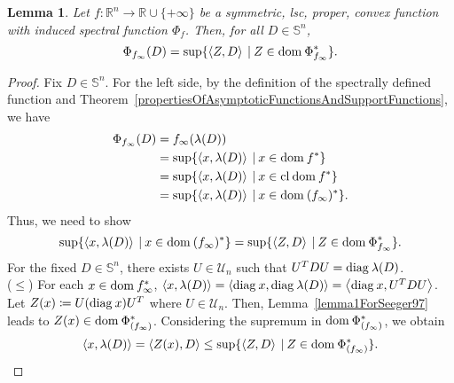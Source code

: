 \documentclass[a4paper,11pt, oneside]{book}
\newtheorem{lem}[thm]{Lemma}
\theoremstyle{definition}
\newcommand{\RealNumberSet}{\mathbb{R}}
\newcommand{\NDemenstionalRealEuclideanSpace}{\mathbb{R}^n}
\newcommand{\NDemenstionalRealSymmetricMatrixSpace}{\mathbb{S}^n}
\newcommand{\NDemenstionalRealOthonormalMatrixSpace}{\mathcal{U}_n}
\newcommand{\Closure}[1]{\text{\rm cl\:${#1}$}} %
\newcommand{\Domain}[1]{\text{\rm dom\:${#1}$}} %
\newcommand{\Diagnosis}[1]{\text{\rm diag\:${#1}$}} %
\newcommand{\InnerProduct}[2]{\left\langle {#1},{#2}\right\rangle} %
\newcommand{\ExtendedRealValuedFunction}[2]{{#1}: {#2} \to \RealNumberSet \cup \{+\infty\}}
\newcommand{\ConjugateFunction}[1]{{#1}^*}
\begin{document}
\begin{lem}\label{lemma2ForSeeger97}
  Let $\ExtendedRealValuedFunction{f}{\NDemenstionalRealEuclideanSpace}$ be a symmetric, lsc, proper, convex function with induced spectral function $\Phi_{f}$. Then, for all $D \in \NDemenstionalRealSymmetricMatrixSpace$,
  \begin{equation}
    \Phi_{f_{\infty}}(D) = \sup \{\InnerProduct{Z}{D} \:|\: Z \in \Domain{\Phi}_{f_{\infty}}^*\}. \notag
  \end{equation}
\end{lem}

\begin{proof}
  Fix $D \in \NDemenstionalRealSymmetricMatrixSpace$. For the left side, by the definition of the spectrally defined function and Theorem~\ref{propertiesOfAsymptoticFunctionsAndSupportFunctions}, we have
  \begin{equation}
    \begin{split}
      \Phi_{f_{\infty}}(D) &= f_{\infty}(\lambda(D)) \\
      &= \sup \{\InnerProduct{x}{\lambda(D)}\:|\:x\in\Domain{\ConjugateFunction{f}}\} \\
      &= \sup \{\InnerProduct{x}{\lambda(D)}\:|\:x\in\Closure{\Domain{\ConjugateFunction{f}}}\}\\
      &= \sup \{\InnerProduct{x}{\lambda(D)}\:|\:x\in\Domain{(f_{\infty})^*}\}. \notag
    \end{split}
  \end{equation}
  Thus, we need to show
  \begin{equation}
    \sup \{\InnerProduct{x}{\lambda(D)}\:|\:x\in\Domain{(f_{\infty})^*}\} =
    \sup \{\InnerProduct{Z}{D} \:|\: Z \in \Domain{\Phi}_{f_{\infty}}^*\}. \notag
  \end{equation}
  For the fixed $D \in \NDemenstionalRealSymmetricMatrixSpace$, there exists $U \in \NDemenstionalRealOthonormalMatrixSpace$ such that $U^TDU = \Diagnosis{\lambda (D)}$.\\
  ($\leq$) For each $x \in \Domain{f_{\infty}^*}$, $\InnerProduct{x}{\lambda(D)} = \InnerProduct{\Diagnosis{x}}{\Diagnosis{\lambda(D)}} = \InnerProduct{\Diagnosis{x}}{U^TDU}$. Let $Z(x) \coloneqq U(\Diagnosis{x})U^T$ where $U \in \NDemenstionalRealOthonormalMatrixSpace$. Then, Lemma~\ref{lemma1ForSeeger97} leads to $Z(x) \in \Domain{\Phi^*_{(f_{\infty})}}$. Considering the supremum in $\Domain{\Phi^*_{(f_{\infty})}}$, we obtain
  \begin{equation}
    \InnerProduct{x}{\lambda(D)} = \InnerProduct{Z(x)}{D} \leq \sup \{\InnerProduct{Z}{D} \:|\: Z \in \Domain{\Phi^*_{(f_{\infty})}}\}. \notag

\end{equation}
\end{proof}
\end{document}
